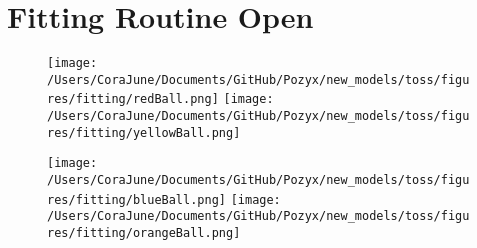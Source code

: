 \documentclass{article}
\begin{document}
\section{Fitting Routine Open}
\begin{figure}[h!]
\begin{multicols}{2}
    \texttt{[image: /Users/CoraJune/Documents/GitHub/Pozyx/new\_models/toss/figures/fitting/redBall.png]}
    \texttt{[image: /Users/CoraJune/Documents/GitHub/Pozyx/new\_models/toss/figures/fitting/yellowBall.png]}
\end{multicols}

\begin{multicols}{2}
    \texttt{[image: /Users/CoraJune/Documents/GitHub/Pozyx/new\_models/toss/figures/fitting/blueBall.png]}
    \texttt{[image: /Users/CoraJune/Documents/GitHub/Pozyx/new\_models/toss/figures/fitting/orangeBall.png]}
\end{multicols}


\end{figure}

\end{document}
